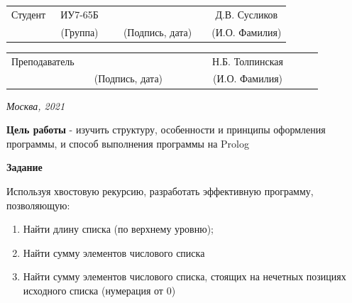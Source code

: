 \documentclass[12pt, a4paper]{extarticle}
\begin{document}
\noindent
{}
\\

\noindent
{}
\\

\vspace{1.5cm}
\noindent
\begin{tabular}{l c c c c c}
	Студент      & ~ИУ7-65Б~               & \hspace{2.5cm} & \hspace{2cm}                 & &  Д.В. Сусликов \\\cline{2-2}\cline{4-4} \cline{6-6} 
	\hspace{3cm} & {\footnotesize(Группа)} &                & {\footnotesize(Подпись, дата)} & & {\footnotesize(И.О. Фамилия)}
\end{tabular}

\noindent
\begin{tabular}{l c c c c}
	Преподаватель & \hspace{5cm}   & \hspace{2cm}                 & & ~~~~~~Н.Б. Толпинская~~~~~~\\\cline{3-3} \cline{5-5} 
	\hspace{3cm}  &                & {\footnotesize(Подпись, дата)} & & {\footnotesize(И.О. Фамилия)}
\end{tabular}

\vspace{0.6cm}
\begin{center}	
	\vfill
	\large \textit {Москва, 2021}
\end{center}

\thispagestyle {empty}
\pagebreak

\clearpage


\textbf{Цель работы} - изучить структуру, особенности и принципы оформления программы, и способ выполнения программы на Prolog

\textbf{Задание}

Используя хвостовую рекурсию, разработать эффективную программу, позволяющую:
\begin{enumerate}
	\item Найти длину списка (по верхнему уровню);
	\item Найти сумму элементов числового списка 
	\item Найти сумму элементов числового списка, стоящих на нечетных позициях исходного списка (нумерация от 0) 
\end{enumerate}
\end{document}
